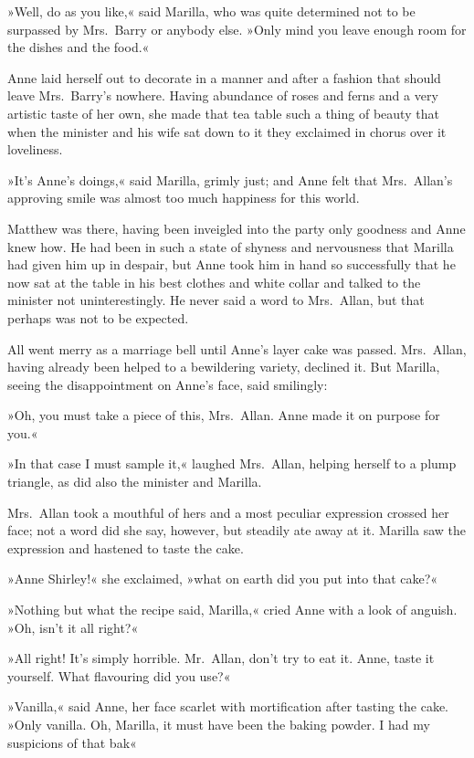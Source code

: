 »Well, do as you like,« said Marilla, who was quite determined not to be surpassed by Mrs.~Barry or anybody else. »Only mind you leave enough room for the dishes and the food.«

Anne laid herself out to decorate in a manner and after a fashion that should leave Mrs.~Barry's nowhere. Having abundance of roses and ferns and a very artistic taste of her own, she made that tea table such a thing of beauty that when the minister and his wife sat down to it they exclaimed in chorus over it loveliness.

»It's Anne's doings,« said Marilla, grimly just; and Anne felt that Mrs.~Allan's approving smile was almost too much happiness for this world.

Matthew was there, having been inveigled into the party only goodness and Anne knew how. He had been in such a state of shyness and nervousness that Marilla had given him up in despair, but Anne took him in hand so successfully that he now sat at the table in his best clothes and white collar and talked to the minister not uninterestingly. He never said a word to Mrs.~Allan, but that perhaps was not to be expected.

All went merry as a marriage bell until Anne's layer cake was passed. Mrs.~Allan, having already been helped to a bewildering variety, declined it. But Marilla, seeing the disappointment on Anne's face, said smilingly:

»Oh, you must take a piece of this, Mrs.~Allan. Anne made it on purpose for you.«

»In that case I must sample it,« laughed Mrs.~Allan, helping herself to a plump triangle, as did also the minister and Marilla.

Mrs.~Allan took a mouthful of hers and a most peculiar expression crossed her face; not a word did she say, however, but steadily ate away at it. Marilla saw the expression and hastened to taste the cake.

»Anne Shirley!« she exclaimed, »what on earth did you put into that cake?«

»Nothing but what the recipe said, Marilla,« cried Anne with a look of anguish. »Oh, isn't it all right?«

»All right! It's simply horrible. Mr.~Allan, don't try to eat it. Anne, taste it yourself. What flavouring did you use?«

»Vanilla,« said Anne, her face scarlet with mortification after tasting the cake. »Only vanilla. Oh, Marilla, it must have been the baking powder. I had my suspicions of that bak\longdash«

